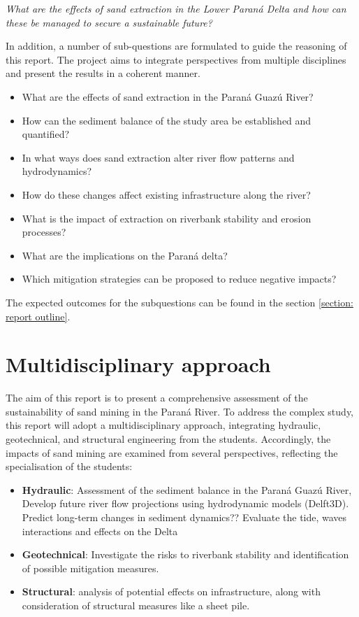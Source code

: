 \textit{What are the effects of sand extraction in the Lower Paraná
Delta and how can these be managed to secure a sustainable future?}

In addition, a number of sub-questions are formulated to guide the reasoning of this report. The project aims to integrate perspectives from multiple disciplines and present the results in a coherent manner.

\begin{itemize} 
    \item What are the effects of sand extraction in the Paraná Guazú River?
    \item How can the sediment balance of the study area be established and quantified?
    \item In what ways does sand extraction alter river flow patterns and hydrodynamics?
    \item How do these changes affect existing infrastructure along the river?
    \item What is the impact of extraction on riverbank stability and erosion processes?
    \item What are the implications on the Paraná delta?
    \item Which mitigation strategies can be proposed to reduce negative impacts?
\end{itemize}

The expected outcomes for the subquestions can be found in the section \ref{section: report outline}.

\section{Multidisciplinary approach}
The aim of this report is to present a comprehensive assessment of the sustainability of sand mining in the Paraná River.
To address the complex study, this report will adopt a multidisciplinary approach, integrating hydraulic, geotechnical, and structural engineering from the students.
Accordingly, the impacts of sand mining are examined from several perspectives, reflecting the specialisation of the students:

\begin{itemize}
    \item \textbf{Hydraulic}: 
    Assessment of the sediment balance in the Paraná Guazú River,
    Develop future river flow projections using hydrodynamic models (Delft3D). Predict long-term changes in sediment dynamics??
    Evaluate the tide, waves interactions and effects on the Delta
    \item \textbf{Geotechnical}: 
    Investigate the risks to riverbank stability and identification of possible mitigation measures.
    \item \textbf{Structural}: analysis of potential effects on infrastructure, along with consideration of structural measures like a sheet pile.
\end{itemize}

